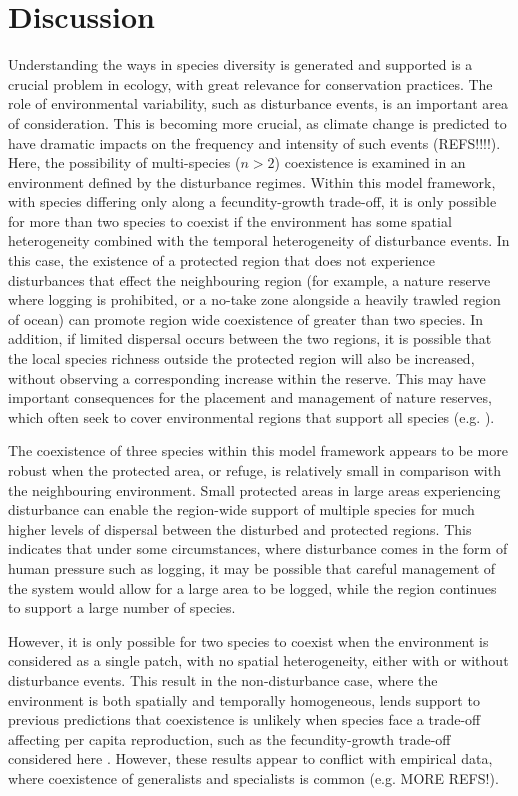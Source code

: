 \documentclass[preprint,10pt,reqno]{amsart}
\begin{document}
\section{Discussion}
Understanding the ways in species diversity is generated and supported is a crucial problem in ecology, with great relevance for conservation practices. The role of environmental variability, such as disturbance events, is an important area of consideration. This is becoming more crucial, as climate change is predicted to have dramatic impacts on the frequency and intensity of such events (REFS!!!!). Here, the possibility of multi-species ($n>2$) coexistence is examined in an environment defined by the disturbance regimes. Within this model framework, with species differing only along a fecundity-growth trade-off, it is only possible for more than two species to coexist if the environment has some spatial heterogeneity combined with the temporal heterogeneity of disturbance events. In this case, the existence of a protected region that does not experience disturbances that effect the neighbouring region (for example, a nature reserve where logging is prohibited, or a no-take zone alongside a heavily trawled region of ocean) can promote region wide coexistence of greater than two species. In addition, if limited dispersal occurs between the two regions, it is possible that the local species richness outside the protected region will also be increased, without observing a corresponding increase within the reserve. This may have important consequences for the placement and management of nature reserves, which often seek to cover environmental regions that support all species (e.g. \cite{margules1988selecting,scott2001nature}).

The coexistence of three species within this model framework appears to be more robust when the protected area, or refuge, is relatively small in comparison with the neighbouring environment. Small protected areas in large areas experiencing disturbance can enable the region-wide support of multiple species for much higher levels of dispersal between the disturbed and protected regions. This indicates that under some circumstances, where disturbance comes in the form of human pressure such as logging, it may be possible that careful management of the system would allow for a large area to be logged, while the region continues to support a large number of species.

However, it is only possible for two species to coexist when the environment is considered as a single patch, with no spatial heterogeneity, either with or without disturbance events. This result in the non-disturbance case, where the environment is both spatially and temporally homogeneous, lends support to previous predictions that coexistence is unlikely when species face a trade-off affecting per capita reproduction, such as the fecundity-growth trade-off considered here \cite{egas2004evolution}.
 However, these results appear to conflict with empirical data, where coexistence of generalists and specialists is common (e.g. \cite{morris1996coexistence} MORE REFS!). 
 
\end{document}
